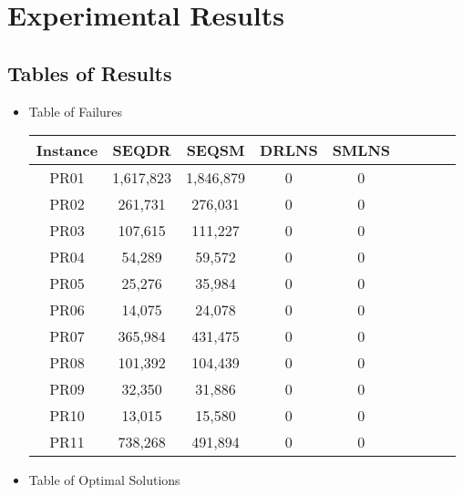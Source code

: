\section{Experimental Results}
\subsection{Tables of Results}
\begin{itemize}
    \item Table of Failures
    
        \begin{table}[!h]
    \label{T:instances}
        \begin{center}
        \begin{tabular}{| c | c | c | c | c | c | c | c | c | }
\hline

\textbf{Instance} & \textbf{SEQDR} & \textbf{SEQSM} & \textbf{DRLNS} & \textbf{SMLNS}  \\
\hline
PR01 & 1,617,823  & 1,846,879 &  0 & 0  \\ \hline
PR02 & 261,731  & 276,031  &  0 & 0  \\ \hline
PR03 & 107,615  & 111,227 &  0 & 0 \\ \hline
PR04 & 54,289  & 59,572 &  0 & 0  \\ \hline
PR05 & 25,276  & 35,984 &  0 & 0  \\ \hline
PR06 & 14,075  & 24,078 & 0 & 0 \\ \hline
PR07 & 365,984  & 431,475 &  0 & 0  \\ \hline
PR08 & 101,392  & 104,439 &  0 & 0  \\ \hline
PR09 & 32,350  & 31,886 &  0 & 0  \\ \hline
PR10 & 13,015  & 15,580  &  0 & 0  \\ \hline
PR11 & 738,268  & 491,894 &  0 & 0  \\ \hline
\hline
\end{tabular}
\end{center}
\end{table}

    \item Table of Optimal Solutions
        \begin{table}[!h]
    \label{T:instances}
        \begin{center}
        \begin{tabular}{| c | c | c | c | c | c | c | c | c | }
\hline


\end{tabular}
\end{center}
\end{table}
\end{itemize}
